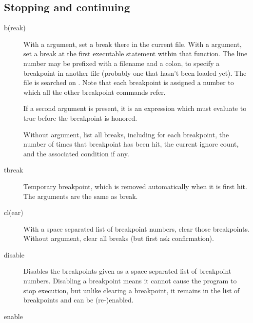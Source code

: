 \subsection{Stopping and continuing}
\begin{description}
\item[b(reak) ]

With a  argument, set a break there in the current
file.  With a  argument, set a break at the first
executable statement within that function.
The line number may be prefixed with a filename and a colon,
to specify a breakpoint in another file (probably one that
hasn't been loaded yet).  The file is searched on .
Note that each breakpoint is assigned a number to which all the other
breakpoint commands refer.

If a second argument is present, it is an expression which must
evaluate to true before the breakpoint is honored.

Without argument, list all breaks, including for each breakpoint,
the number of times that breakpoint has been hit, the current
ignore count, and the associated condition if any.

\item[tbreak ]

Temporary breakpoint, which is removed automatically when it is
first hit.  The arguments are the same as break.

\item[cl(ear) ]

With a space separated list of breakpoint numbers, clear those
breakpoints.  Without argument, clear all breaks (but first
ask confirmation).

\item[disable ]

Disables the breakpoints given as a space separated list of
breakpoint numbers.  Disabling a breakpoint means it cannot cause
the program to stop execution, but unlike clearing a breakpoint, it
remains in the list of breakpoints and can be (re-)enabled.

\item[enable ]


\end{description}
